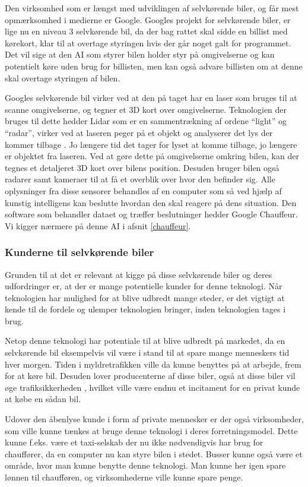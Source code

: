 Den virksomhed som er længst med udviklingen af selvkørende biler, og får mest opmærksomhed i medierne er Google\cite{GOOGLEHOW}. Googles projekt for selvkørende biler, er lige nu en niveau 3 selvkørende bil, da der bag rattet skal sidde en billist med kørekort, klar til at overtage styringen hvis der går noget galt for programmet. Det vil sige at den AI som styrer bilen holder styr på omgivelserne og kan potentielt køre uden brug for billisten, men kan også advare billisten om at denne skal overtage styringen af bilen.


Googles selvkørende bil virker ved at den på taget har en laser som bruges til at scanne omgivelserne, og tegner et 3D kort over omgivelserne. Teknologien der bruges til dette hedder Lidar som er en sammentrækning af ordene ``light'' og ``radar'', virker ved at laseren peger på et objekt og analyserer det lys der kommer tilbage \cite{Lidar}. Jo længere tid det tager for lyset at komme tilbage, jo længere er objektet fra laseren. Ved at gøre dette på omgivelserne omkring bilen, kan der tegnes et detaljeret 3D kort over bilens position. Desuden bruger bilen også radarer samt kameraer til at få et overblik over hvor den befinder sig. Alle oplysninger fra disse sensorer behandles af en computer som så ved hjælp af kunstig intelligens kan beslutte hvordan den skal reagere på dens situation. Den software som behandler dataet og træffer beslutninger hedder Google Chauffeur. Vi kigger nærmere på denne AI i afsnit \ref{chauffeur}.


\subsubsection{Kunderne til selvkørende biler}
Grunden til at det er relevant at kigge på disse selvkørende biler og deres udfordringer er, at der er mange potentielle kunder for denne teknologi. Når teknologien har mulighed for at blive udbredt mange steder, er det vigtigt at kende til de fordele og ulemper teknologien bringer, inden teknologien tages i brug.

Netop denne teknologi har potentiale til at blive udbredt på markedet, da en selvkørende bil eksempelvis vil være i stand til at spare mange menneskers tid hver morgen. Tiden i myldretrafikken ville da kunne benyttes på at arbejde, frem for at køre bil. Desuden lover producenterne af disse biler, også at disse biler vil øge trafiksikkerheden \cite{GOOG_SITE}, hvilket ville være endnu et incitament for en privat kunde at købe en sådan bil.

Udover den åbenlyse kunde i form af private mennesker er der også virksomheder, som ville kunne tænkes at bruge denne teknologi i deres forretningsmodel. Dette kunne f.eks. være et taxi-selskab der nu ikke nødvendigvis har brug for chauffører, da en computer nu kan styre bilen i stedet. Busser kunne også være et område, hvor man kunne benytte denne teknologi. Man kunne her igen spare lønnen til chaufføren, og virksomhederne ville kunne spare penge.

